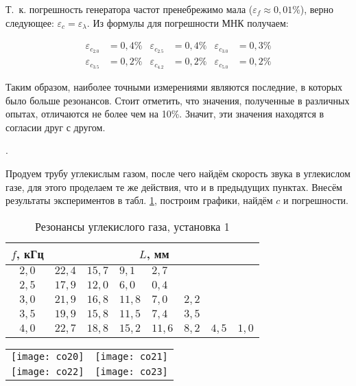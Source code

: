 \documentclass[a4paper, 12pt]{article}
\newcommand{\eps}{\varepsilon}
\newcounter{Points}
\newcommand{\point}{\arabic{Points}. \addtocounter{Points}{1}}
\begin{document}
Т.~к. погрешность генератора частот пренебрежимо мала ($\eps_f \approx 0,01\%$), верно следующее: $\displaystyle \eps_c = \eps_\lambda$. Из формулы для погрешности МНК получаем:

\begin{align*}
    \eps_{c_{2.0}} &= 0,4\% &
    \eps_{c_{2.5}} &= 0,4\% &
    \eps_{c_{3.0}} &= 0,3\% \\
    \eps_{c_{3.5}} &= 0,2\% &
    \eps_{c_{4.2}} &= 0,2\% &
    \eps_{c_{5.0}} &= 0,2\% 
\end{align*}

Таким образом, наиболее точными измерениями являются последние, в которых было больше резонансов. Стоит отметить, что значения, полученные в различных опытах, отличаются не более чем на 10\%. Значит, эти значения находятся в согласии друг с другом.

\point Продуем трубу углекислым газом, после чего найдём скорость звука в углекислом газе, для этого проделаем те же действия, что и в предыдущих пунктах. Внесём результаты экспериментов в табл. \ref{tabl:2}, построим графики, найдём $c$ и погрешности.

\begin{table}[!h]
    \begin{tabularx}{\linewidth}{|c|X|X|X|X|X|X|X|}
        \hline
        $f$, кГц & \multicolumn{7}{c|}{$L$, мм} \\ \hline
        $2,0$ & $22,4$ & $15,7$ & $9,1$  & $2,7$ & \multicolumn{3}{c|}{} \\ \hline
        $2,5$ & $17,9$ & $12,0$ & $6,0$  & $0,4$ & \multicolumn{3}{c|}{} \\ \hline
        $3,0$ & $21,9$ & $16,8$ & $11,8$ & $7,0$ & $2,2$ & \multicolumn{2}{c|}{} \\ \hline
        $3,5$ & $19,9$ & $15,8$ & $11,5$ & $7,4$ & $3,5$ & \multicolumn{2}{c|}{} \\ \hline
        $4,0$ & $22,7$ & $18,8$ & $15,2$ & $11,6$ & $8,2$ & $4,5$ & $1,0$ \\ \hline 
    \end{tabularx}
\caption{Резонансы углекислого газа, установка 1}
\label{tabl:2}
\end{table}

\begin{tabular}{cc}
    \texttt{[image: co20]} &
    \texttt{[image: co21]} \\
    \texttt{[image: co22]} &
    \texttt{[image: co23]} \\
\end{tabular}
\end{document}

